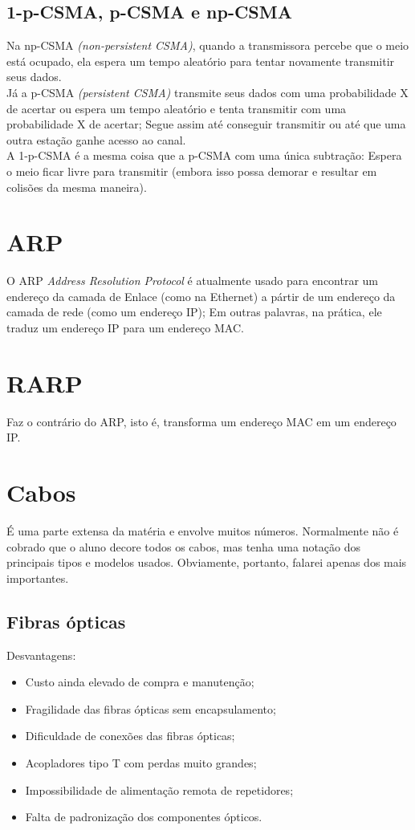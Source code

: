 \documentclass{article}
\begin{document}
\subsection{1-p-CSMA, p-CSMA e np-CSMA}
Na np-CSMA \textit{(non-persistent CSMA)}, quando a transmissora percebe que o
meio está ocupado, ela espera um tempo aleatório para tentar novamente
transmitir seus dados.\\ Já a p-CSMA \textit{(persistent CSMA)} transmite seus
dados com uma probabilidade X de acertar ou espera um tempo aleatório e tenta
transmitir com uma probabilidade X de acertar; Segue assim até conseguir
transmitir ou até que uma outra estação ganhe acesso ao canal. \\ A 1-p-CSMA é a
mesma coisa que a p-CSMA com uma única subtração: Espera o meio ficar livre para
transmitir (embora isso possa demorar e resultar em colisões da mesma maneira).

\section{ARP}
O ARP \textit{Address Resolution Protocol} é atualmente usado para encontrar um
endereço da camada de Enlace (como na Ethernet) a pártir de um endereço da
camada de rede (como um endereço IP); Em outras palavras, na prática, ele traduz
um endereço IP para um endereço MAC.

\section{RARP}
Faz o contrário do ARP, isto é, transforma um endereço MAC em um endereço IP.

\section{Cabos}

É uma parte extensa da matéria e envolve muitos números. Normalmente não é
cobrado que o aluno decore todos os cabos, mas tenha uma notação dos principais
tipos e modelos usados. Obviamente, portanto, falarei apenas dos mais
importantes.

\subsection{Fibras ópticas}
Desvantagens:
\begin{itemize}

	\item Custo ainda elevado de compra e manutenção;
	\item Fragilidade das fibras ópticas sem encapsulamento;
	\item Dificuldade de conexões das fibras ópticas;
	\item Acopladores tipo T com perdas muito grandes;
	\item Impossibilidade de alimentação remota de repetidores;
	\item Falta de padronização dos componentes ópticos.
\end{itemize}
\end{document}
